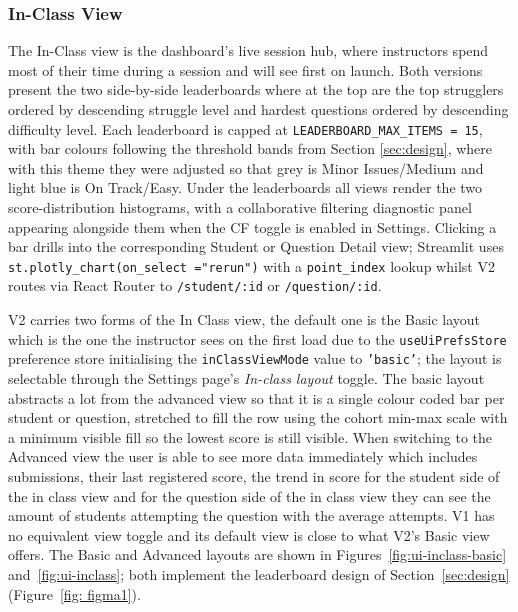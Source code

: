 \subsubsection{In-Class View}

The In-Class view is the dashboard's live session hub, where instructors spend most of their time during a session and will see first on launch. Both versions present the two side-by-side leaderboards where at the top are the top strugglers ordered by descending struggle level and hardest questions ordered by descending difficulty level. 
Each leaderboard is capped at \texttt{LEADERBOARD\_MAX\_ITEMS = 15}, with bar colours following the threshold bands from Section \ref{sec:design}, where with this theme they were adjusted so that grey is Minor Issues/Medium and light blue is On Track/Easy. 
Under the leaderboards all views render the two score-distribution histograms, with a collaborative filtering diagnostic panel appearing alongside them when the CF toggle is enabled in Settings. 
Clicking a bar drills into the corresponding Student or Question Detail view; Streamlit uses \texttt{st.plotly\_chart(on\_select ="rerun")} with a \texttt{point\_index} lookup whilst V2 routes via React Router to \texttt{/student/:id} or \texttt{/question/:id}. 

V2 carries two forms of the In Class view, the default one is the Basic layout which is the one the instructor sees on the first load due to the \texttt{useUiPrefsStore} preference store initialising the \texttt{inClassViewMode} value to \texttt{'basic'}; the layout is selectable through the Settings page's \emph{In-class layout} toggle. 
The basic layout abstracts a lot from the advanced view so that it is a single colour coded bar per student or question, stretched to fill the row using the cohort min-max scale with a minimum visible fill so the lowest score is still visible. 
When switching to the Advanced view the user is able to see more data immediately which includes submissions, their last registered score, the trend in score for the student side of the in class view and for the question side of the in class view they can see the amount of students attempting the question with the average attempts. 
V1 has no equivalent view toggle and its default view is close to what V2's Basic view offers. The Basic and Advanced layouts are shown in Figures~\ref{fig:ui-inclass-basic} and~\ref{fig:ui-inclass}; both implement the leaderboard design of Section~\ref{sec:design} (Figure~\ref{fig: figma1}).


